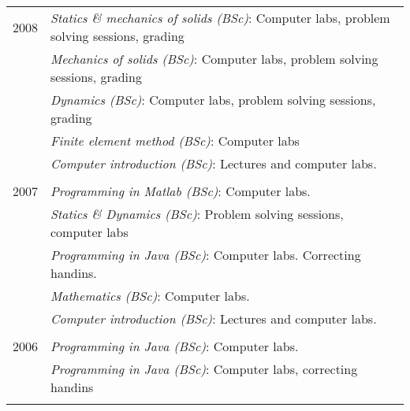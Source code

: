 \documentclass[a4paper,10pt]{article} %
\begin{document}
{\begin{tabular}{r|p{11cm}}

\textsc{2008} 
              & \emph{Statics \& mechanics of solids (BSc)}: \footnotesize{Computer labs, problem solving sessions, grading}\\
              & \emph{Mechanics of solids (BSc)}: \footnotesize{Computer labs, problem solving sessions, grading}\\
              & \emph{Dynamics (BSc)}: \footnotesize{Computer labs, problem solving sessions, grading}\\
              & \emph{Finite element method (BSc)}: \footnotesize{Computer labs}\\
              & \emph{Computer introduction (BSc)}: \footnotesize{Lectures and computer labs.}\\
\multicolumn{2}{c}{} \\


\textsc{2007} 
              & \emph{Programming in Matlab (BSc)}: \footnotesize{Computer labs.}\\
              & \emph{Statics \& Dynamics (BSc)}: \footnotesize{Problem solving sessions, computer labs}\\
              & \emph{Programming in Java (BSc)}: \footnotesize{Computer labs. Correcting handins.}\\
              & \emph{Mathematics (BSc)}: \footnotesize{Computer labs.}\\
              & \emph{Computer introduction (BSc)}: \footnotesize{Lectures and computer labs.}\\
\multicolumn{2}{c}{} \\


\textsc{2006} 
              & \emph{Programming in Java (BSc)}: \footnotesize{Computer labs.}\\
              & \emph{Programming in Java (BSc)}: \footnotesize{Computer labs, correcting handins}\\
\multicolumn{2}{c}{} \\

% 

\end{tabular}

}
\end{document}
